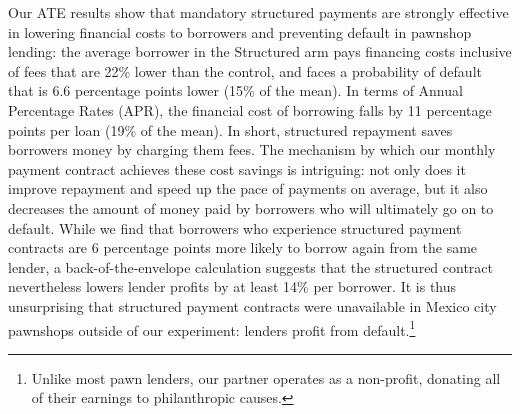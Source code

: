 \documentclass[12pt, a4paper, colorinlistoftodos]{article}
\begin{document}


Our ATE results show that mandatory structured payments are strongly effective in lowering financial costs to borrowers and preventing default in pawnshop lending: the average borrower in the Structured arm pays financing costs inclusive of fees that are 22\% lower than the control, and faces a probability of default that is 6.6 percentage points lower (15\% of the mean). In terms of Annual Percentage Rates (APR), the financial cost of borrowing falls by 11 percentage points per loan (19\% of the mean). In short, structured repayment saves borrowers money by charging them fees. The mechanism by which our monthly payment contract achieves these cost savings is intriguing: not only does it improve repayment and speed up the pace of payments on average, but it also decreases the amount of money paid by borrowers who will ultimately go on to default. While we find that borrowers who experience structured payment contracts are 6 percentage points more likely to borrow again from the same lender, a back-of-the-envelope calculation suggests that the structured contract nevertheless lowers lender profits by at least 14\% per borrower. It is thus unsurprising that structured payment contracts were unavailable in Mexico city pawnshops outside of our experiment: lenders profit from default.\footnote{Unlike most pawn lenders, our partner operates as a non-profit, donating all of their earnings to philanthropic causes.}
\end{document}
